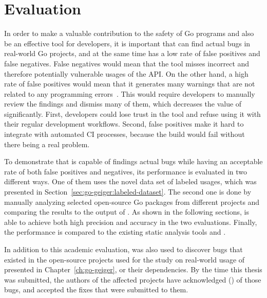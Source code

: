 
\section{Evaluation}\label{sec:go-safer:evaluation}

In order to make a valuable contribution to the safety of Go programs and also be an effective tool for developers, it
is important that \toolSafer{} can find actual bugs in real-world Go projects, and at the same time has a low rate of
false positives and false negatives.
False negatives would mean that the tool misses incorrect and therefore potentially vulnerable usages of the \unsafe{}
\acrshort{API}.
On the other hand, a high rate of false positives would mean that it generates many warnings that are not related to
any programming errors~\cite{banerjee2009}.
This would require developers to manually review the findings and dismiss many of them, which decreases the value of
\toolSafer{} significantly.
First, developers could lose trust in the tool and refuse using it with their regular development workflows.
Second, false positives make it hard to integrate \toolSafer{} with automated \acrshort{CI} processes, because the build
would fail without there being a real problem.

To demonstrate that \toolSafer{} is capable of findings actual bugs while having an acceptable rate of both false
positives and negatives, its performance is evaluated in two different ways.
One of them uses the novel data set of labeled \unsafe{} usages, which was presented in
Section~\ref{sec:go-geiger:labeled-dataset}.
The second one is done by manually analyzing  selected open-source Go packages from different projects and
comparing the results to the output of \toolSafer{}.
As shown in the following sections, \toolSafer{} is able to achieve both high precision and accuracy in the two
evaluations.
Finally, the performance is compared to the existing static analysis tools \toolVet{} and \toolGosec{}.

In addition to this academic evaluation, \toolSafer{} was also used to discover \numberBugsFixed{} bugs that existed in
the open-source projects used for the study on real-world usage of \unsafe{} presented in Chapter~\ref{ch:go-geiger}, or
their dependencies.
By the time this thesis was submitted, the authors of the affected projects have acknowledged \numberBugsMerged{}
(\fractionBugsMerged{}) of those bugs, and accepted the fixes that were submitted to them.


